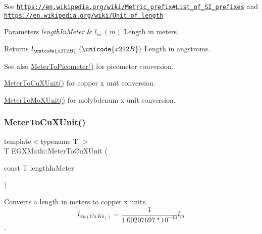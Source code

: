 See \href{https://en.wikipedia.org/wiki/Metric_prefix#List_of_SI_prefixes}{\tt https\+://en.\+wikipedia.\+org/wiki/\+Metric\+\_\+prefix\#\+List\+\_\+of\+\_\+\+S\+I\+\_\+prefixes} and \href{https://en.wikipedia.org/wiki/Unit_of_length}{\tt https\+://en.\+wikipedia.\+org/wiki/\+Unit\+\_\+of\+\_\+length} 
\begin{DoxyParams}{Parameters}
{\em length\+In\+Meter} & $ l_{m}\ (m)$ Length in meters. \\
\hline
\end{DoxyParams}
\begin{DoxyReturn}{Returns}
$ l_{\unicode{x212B}}\ (\unicode{x212B})$ Length in angstroms. 
\end{DoxyReturn}
\begin{DoxySeeAlso}{See also}
\mbox{\hyperlink{group___e_g_x_math-_conversions-_length_conversions-_s_i-_meter-_s_i_ga5e136454c20254062d6e8637cfbfb8ee}{Meter\+To\+Picometer()}} for picometer conversion. 

\mbox{\hyperlink{group___e_g_x_math-_conversions-_length_conversions-_s_i-_meter-_non-_s_i_ga67cec26b74704753fc51a8f4db27a4b4}{Meter\+To\+Cu\+X\+Unit()}} for copper x unit conversion. 

\mbox{\hyperlink{group___e_g_x_math-_conversions-_length_conversions-_s_i-_meter-_non-_s_i_gae0351200a3d90c4efe741c6057b2fd4b}{Meter\+To\+Mo\+X\+Unit()}} for molybdenum x unit conversion. 
\end{DoxySeeAlso}
\mbox{\label{group___e_g_x_math-_conversions-_length_conversions-_s_i-_meter-_non-_s_i_ga67cec26b74704753fc51a8f4db27a4b4}} 
\subsubsection{\texorpdfstring{Meter\+To\+Cu\+X\+Unit()}{MeterToCuXUnit()}}
{\footnotesize\ttfamily template$<$typename T $>$ \\
T E\+G\+X\+Math\+::\+Meter\+To\+Cu\+X\+Unit (\begin{DoxyParamCaption}\item[{const T}]{length\+In\+Meter }\end{DoxyParamCaption})}



Converts a length in meters to copper x units. \[ l_{xu(Cu\ K\alpha_1)}= \frac{1}{1.00207697*10^{-13}} l_{m} \]. 


